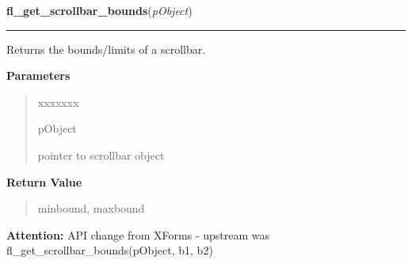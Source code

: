 \hspace{.8\funcindent}\begin{boxedminipage}{\funcwidth}

    \raggedright \textbf{fl\_get\_scrollbar\_bounds}(\textit{pObject})

    \vspace{-1.5ex}

    \rule{\textwidth}{0.5\fboxrule}
\setlength{\parskip}{2ex}
    Returns the bounds/limits of a scrollbar.

\setlength{\parskip}{1ex}
      \textbf{Parameters}
      \vspace{-1ex}

      \begin{quote}
        \begin{Ventry}{xxxxxxx}

          \item[pObject]

          pointer to scrollbar object

        \end{Ventry}

      \end{quote}

      \textbf{Return Value}
    \vspace{-1ex}

      \begin{quote}
      minbound, maxbound

      \end{quote}

\textbf{Attention:} API change from XForms - upstream was fl\_get\_scrollbar\_bounds(pObject, 
b1, b2)



    \end{boxedminipage}

    \label{xformslib:library:fl_set_scrollbar_return}

    \vspace{0.5ex}

